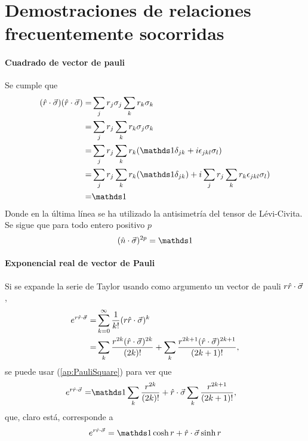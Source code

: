 \chapter{Demostraciones de relaciones frecuentemente socorridas}

\subsubsection{Cuadrado de vector de pauli}
Se cumple que
\begin{align*}
    (\paulivec{r})(\paulivec{r})=&\sum_{j}r_{j}\pauli{j}\sum_{k}r_{k}\pauli{k}\\
    =&\sum_{j}r_{j}\sum_{k}r_{k}\pauli{j}\pauli{k}\\
    =&\sum_{j}r_{j}\sum_{k}r_{k}(\Id\delta_{jk}+i\epsilon_{jkl}\pauli{l})\\
    =&\sum_{j}r_{j}\sum_{k}r_{k}(\Id\delta_{jk})+i\sum_{j}r_{j}\sum_{k}r_{k}\epsilon_{jkl}\pauli{l})\\
    =&\Id
\end{align*}
Donde en la última línea se ha utilizado la antisimetría del tensor de Lévi-Civita. Se sigue que para todo entero positivo $p$
\begin{equation}\label{ap:PauliSquare}
    (\paulivec{n})^{2p}=\Id
\end{equation}

\subsubsection{Exponencial real de vector de Pauli}
Si se expande la serie de Taylor usando como argumento un vector de pauli $r\hat{r}\cdot\vec{\sigma}$,
\begin{align*}
    e^{r\hat{r}\cdot\vec{\sigma}}=&\sum_{k=0}^{\infty}\frac{1}{k!}(r\hat{r}\cdot\vec{\sigma})^k\\
    =&\sum_{k}\frac{r^{2k}(\hat{r}\cdot\vec{\sigma})^{2k}}{(2k)!}+\sum_{k}\frac{r^{2k+1}(\hat{r}\cdot\vec{\sigma})^{2k+1}}{(2k+1)!},
\end{align*}
se puede usar (\ref{ap:PauliSquare}) para ver que
\begin{align*}
    e^{r\paulivec{r}}=&\Id\sum_{k}\frac{r^{2k}}{(2k)!}+\paulivec{r}\sum_{k}\frac{r^{2k+1}}{(2k+1)!},
\end{align*}
que, claro está, corresponde a
\begin{equation}\label{ap:PauliRealExp}
    e^{r\paulivec{r}}=\Id\cosh{r}+\paulivec{r}\sinh{r}
\end{equation}


